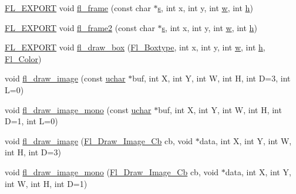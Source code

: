 \begin{DoxyCompactItemize}
\item 
\hyperlink{_fl___export_8_h_aa9ba29a18aee9d738370a06eeb4470fc}{F\+L\+\_\+\+E\+X\+P\+O\+RT} void \hyperlink{group__fl__drawings_ga2e109cb030c3f2fbef45156c687b8138}{fl\+\_\+frame} (const char $\ast$\hyperlink{forms_8_h_a672b4f0a8c8a6db61068c721f799d87f}{s}, int x, int y, int \hyperlink{forms_8_h_aac374e320caaadeca4874add33b62af2}{w}, int \hyperlink{forms_8_h_a7e427ba5b307f9068129699250690066}{h})
\item 
\hyperlink{_fl___export_8_h_aa9ba29a18aee9d738370a06eeb4470fc}{F\+L\+\_\+\+E\+X\+P\+O\+RT} void \hyperlink{group__fl__drawings_gaaae63e60444c66e89a83111132507e16}{fl\+\_\+frame2} (const char $\ast$\hyperlink{forms_8_h_a672b4f0a8c8a6db61068c721f799d87f}{s}, int x, int y, int \hyperlink{forms_8_h_aac374e320caaadeca4874add33b62af2}{w}, int \hyperlink{forms_8_h_a7e427ba5b307f9068129699250690066}{h})
\item 
\hyperlink{_fl___export_8_h_aa9ba29a18aee9d738370a06eeb4470fc}{F\+L\+\_\+\+E\+X\+P\+O\+RT} void \hyperlink{group__fl__drawings_ga475ff2bbcafeb30d4551f635e42d6259}{fl\+\_\+draw\+\_\+box} (\hyperlink{_enumerations_8_h_ae48bf9070f8541de17829f54ccacc6bc}{Fl\+\_\+\+Boxtype}, int x, int y, int \hyperlink{forms_8_h_aac374e320caaadeca4874add33b62af2}{w}, int \hyperlink{forms_8_h_a7e427ba5b307f9068129699250690066}{h}, \hyperlink{_enumerations_8_h_a8b762953646f8abee866061f1af78a6a}{Fl\+\_\+\+Color})
\item 
void \hyperlink{group__fl__drawings_gaf9ad52880174bae01461adfa5b4020ff}{fl\+\_\+draw\+\_\+image} (const \hyperlink{fl__types_8h_a65f85814a8290f9797005d3b28e7e5fc}{uchar} $\ast$buf, int X, int Y, int W, int H, int D=3, int L=0)
\item 
void \hyperlink{group__fl__drawings_gafb938dc103b5c3d9187a538667237d36}{fl\+\_\+draw\+\_\+image\+\_\+mono} (const \hyperlink{fl__types_8h_a65f85814a8290f9797005d3b28e7e5fc}{uchar} $\ast$buf, int X, int Y, int W, int H, int D=1, int L=0)
\item 
void \hyperlink{group__fl__drawings_ga5b8f9bd2d3130529812dcc2c057eee35}{fl\+\_\+draw\+\_\+image} (\hyperlink{_fl___device_8_h_a702e2cb8dd542dda67e5c206b0d73a07}{Fl\+\_\+\+Draw\+\_\+\+Image\+\_\+\+Cb} cb, void $\ast$data, int X, int Y, int W, int H, int D=3)
\item 
void \hyperlink{group__fl__drawings_gab2a42aceaea722696f9b403473ec16a9}{fl\+\_\+draw\+\_\+image\+\_\+mono} (\hyperlink{_fl___device_8_h_a702e2cb8dd542dda67e5c206b0d73a07}{Fl\+\_\+\+Draw\+\_\+\+Image\+\_\+\+Cb} cb, void $\ast$data, int X, int Y, int W, int H, int D=1)

\end{DoxyCompactItemize}
